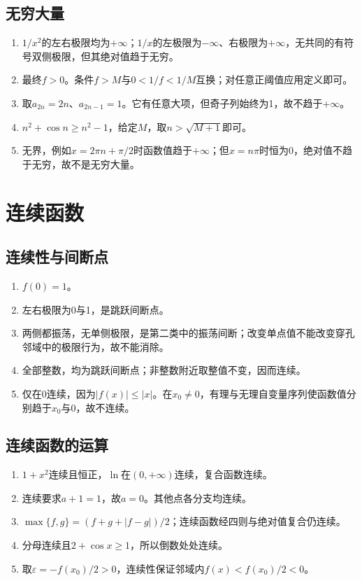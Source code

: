 \documentclass[11pt,a4paper,fontset=fandol]{ctexrep}
\begin{document}
\subsection{无穷大量}
\begin{enumerate}
\item $1/x^2$的左右极限均为$+\infty$；$1/x$的左极限为$-\infty$、右极限为$+\infty$，无共同的有符号双侧极限，但其绝对值趋于无穷。
\item 最终$f>0$。条件$f>M$与$0<1/f<1/M$互换；对任意正阈值应用定义即可。
\item 取$a_{2n}=2n$、$a_{2n-1}=1$。它有任意大项，但奇子列始终为1，故不趋于$+\infty$。
\item $n^2+\cos n\ge n^2-1$，给定$M$，取$n>\sqrt{M+1}$即可。
\item 无界，例如$x=2\pi n+\pi/2$时函数值趋于$+\infty$；但$x=n\pi$时恒为0，绝对值不趋于无穷，故不是无穷大量。
\end{enumerate}
\section{连续函数}
\subsection{连续性与间断点}
\begin{enumerate}
\item $f(0)=1$。
\item 左右极限为0与1，是跳跃间断点。
\item 两侧都振荡，无单侧极限，是第二类中的振荡间断；改变单点值不能改变穿孔邻域中的极限行为，故不能消除。
\item 全部整数，均为跳跃间断点；非整数附近取整值不变，因而连续。
\item 仅在0连续，因为$|f(x)|\le|x|$。在$x_0\ne0$，有理与无理自变量序列使函数值分别趋于$x_0$与0，故不连续。
\end{enumerate}
\subsection{连续函数的运算}
\begin{enumerate}
\item $1+x^2$连续且恒正，$\ln$在$(0,+\infty)$连续，复合函数连续。
\item 连续要求$a+1=1$，故$a=0$。其他点各分支均连续。
\item $\max\{f,g\}=(f+g+|f-g|)/2$；连续函数经四则与绝对值复合仍连续。
\item 分母连续且$2+\cos x\ge1$，所以倒数处处连续。
\item 取$\varepsilon=-f(x_0)/2>0$，连续性保证邻域内$f(x)<f(x_0)/2<0$。
\end{enumerate}
\end{document}
